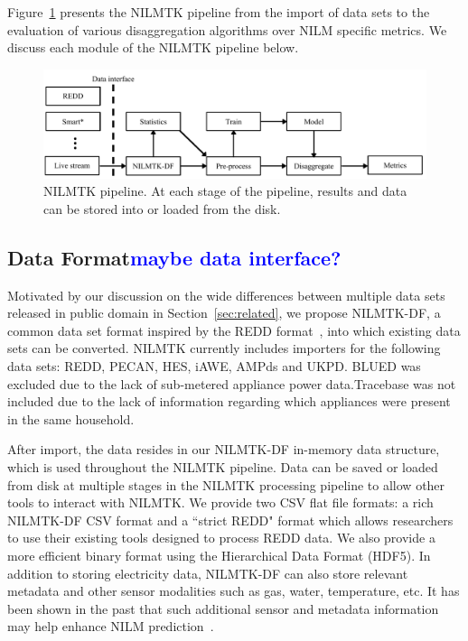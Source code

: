 \documentclass{sig-alternate}
\newcommand{\bluecolor}[1]{\textcolor{blue}{#1}}
\newcommand{\figref}[1]{Figure~\ref{#1}}
\newcommand{\secref}[1]{Section~\ref{#1}}
\begin{document}
\figref{fig:pipeline} presents the NILMTK pipeline from the import of data sets to the evaluation of various disaggregation algorithms over NILM specific metrics. We discuss each module of the NILMTK pipeline below.

\begin{figure}
\centering \includegraphics[scale=0.7]{figures/pipeline.pdf}
\caption{NILMTK pipeline. At each stage of the pipeline, results and data can be stored into or loaded from the disk.}
\label{fig:pipeline}
\end{figure}



\subsection{Data Format\bluecolor{maybe data interface?}}

\noindent
Motivated by our discussion on the wide differences between multiple data sets released in public domain in \secref{sec:related}, we propose NILMTK-DF, a common
data set format inspired by the REDD format~\cite{redd}, into which
existing data sets can be converted. NILMTK currently includes
importers for the following data sets: REDD, PECAN, HES, iAWE, AMPds
and UKPD. BLUED was excluded due to the lack of sub-metered appliance power data.Tracebase was not included due to the lack of information regarding which appliances were present in the same household.

After import, the data resides in our NILMTK-DF in-memory data structure, which is used throughout the NILMTK pipeline. Data can be saved or loaded from disk at multiple stages in the NILMTK processing pipeline to allow other tools to interact with NILMTK.  We provide two CSV flat file formats: a rich NILMTK-DF CSV format and a ``strict REDD" format which allows researchers to use their existing tools designed to process REDD data.  We also provide a more efficient binary format using the Hierarchical Data Format (HDF5).  In addition to storing electricity data, NILMTK-DF can also store relevant metadata and other sensor modalities such as gas, water, temperature, etc. It has been shown in the past that such additional sensor and metadata information may help enhance NILM prediction~\cite{schoofs_2010}. 
\end{document}
